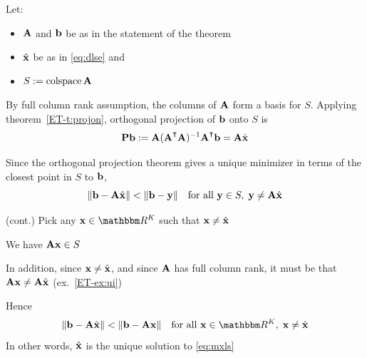 \begin{frame}

    \vspace{2em}
    \Prf 
    
    Let:
    \begin{itemize}
        \item $\mathbf A$ and ${\mathbf b}$ be as in the statement of the theorem
        \item $\hat {\mathbf x}$ be as in \eqref{eq:dlse} and
        \item $S := \operatorname{colspace} \mathbf A$
    \end{itemize}
    By full column rank assumption, the columns of $\mathbf A$ form a basis for
    $S$. Applying theorem~\ref{ET-t:projon}, orthogonal projection of ${\mathbf b}$
    onto $S$ is 
    \begin{equation}
        \label{eq:ibprojon}
        \boldP\boldb 
        := \boldA (\boldA^\T \boldA)^{-1} \boldA^\T \boldb  
         = \boldA \hboldx
    \end{equation}
    
    Since the orthogonal projection theorem gives a unique
    minimizer in terms of the closest point in $S$ to ${\mathbf b}$,
    \begin{equation}
        \label{eq:sfy}
        \| {\mathbf b} - \mathbf A\hat {\mathbf x} \| < \| {\mathbf b} - {\mathbf y}\|
        \quad \text{for all } {\mathbf y} \in S, \; {\mathbf y} \not= \mathbf A \hat {\mathbf x}
    \end{equation}

\end{frame}
    
\begin{frame}
    
    \vspace{2em}
    \Prf (cont.) Pick any $\boldx \in \RR^K$ such that ${\mathbf x} \not= \hat {\mathbf x}$
    
    We have $\mathbf A {\mathbf x} \in S$
    
    In addition, since ${\mathbf x} \not= \hat {\mathbf x}$, and since $\mathbf A$ has full column
    rank, it must be that $\mathbf A {\mathbf x} \not= \mathbf A \hat {\mathbf x}$
    (ex.~\ref{ET-ex:ui})
    
     \vspace{.7em}
    Hence
    \begin{equation*}
        \| \boldb - \boldA\hboldx \| < \| \boldb - \boldA \boldx\|
        \quad \text{for all } \boldx \in \RR^K, \; \boldx \not= \hboldx
    \end{equation*}
    In other words, $\hat {\mathbf x}$ is the unique solution to \eqref{eq:mxls}
    
\end{frame}

